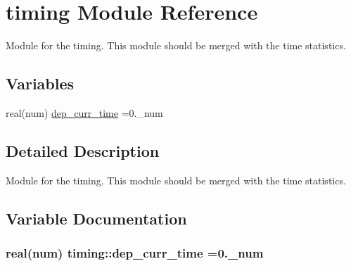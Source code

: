 \hypertarget{namespacetiming}{}\section{timing Module Reference}
\label{namespacetiming}


Module for the timing. This module should be merged with the time statistics.  


\subsection*{Variables}
\begin{DoxyCompactItemize}
\item 
real(num) \hyperlink{namespacetiming_ae300cb5fe1ec6e74c106d185c36e1cfa}{dep\+\_\+curr\+\_\+time} =0.\+\_\+num
\end{DoxyCompactItemize}


\subsection{Detailed Description}
Module for the timing. This module should be merged with the time statistics. 

\subsection{Variable Documentation}
\subsubsection[{\texorpdfstring{dep\+\_\+curr\+\_\+time}{dep_curr_time}}]{\setlength{\rightskip}{0pt plus 5cm}real(num) timing\+::dep\+\_\+curr\+\_\+time =0.\+\_\+num}\hypertarget{namespacetiming_ae300cb5fe1ec6e74c106d185c36e1cfa}{}\label{namespacetiming_ae300cb5fe1ec6e74c106d185c36e1cfa}
